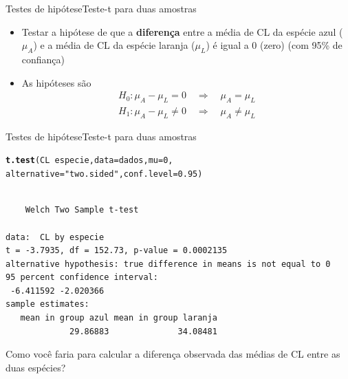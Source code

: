 \documentclass[10pt]{beamer}\usepackage[]{graphicx}\usepackage[]{color}
\makeatletter
\newcommand{\hlnum}[1]{\textcolor[rgb]{0.686,0.059,0.569}{#1}}%
\newcommand{\hlstr}[1]{\textcolor[rgb]{0.192,0.494,0.8}{#1}}%
\newcommand{\hlopt}[1]{\textcolor[rgb]{0,0,0}{#1}}%
\newcommand{\hlstd}[1]{\textcolor[rgb]{0.345,0.345,0.345}{#1}}%
\newcommand{\hlkwc}[1]{\textcolor[rgb]{0.333,0.667,0.333}{#1}}%
\newcommand{\hlkwd}[1]{\textcolor[rgb]{0.737,0.353,0.396}{\textbf{#1}}}%
\newenvironment{kframe}{%
 \def\at@end@of@kframe{}%
 \ifinner\ifhmode%
  \def\at@end@of@kframe{\end{minipage}}%
  \begin{minipage}{\columnwidth}%
 \fi\fi%
 \def\FrameCommand##1{\hskip\@totalleftmargin \hskip-\fboxsep
 \colorbox{shadecolor}{##1}\hskip-\fboxsep
     \hskip-\linewidth \hskip-\@totalleftmargin \hskip\columnwidth}%
 \MakeFramed {\advance\hsize-\width
   \@totalleftmargin\z@ \linewidth\hsize
   \@setminipage}}%
 {\par\unskip\endMakeFramed%
 \at@end@of@kframe}
\newenvironment{knitrout}{}{} %
\theoremstyle{definition}
\makeatother
\begin{document}
\begin{frame}[fragile]{Testes de hipótese}{Teste-t para duas amostras}
  \begin{itemize}
  \item Testar a hipótese de que a \textbf{diferença} entre a média de
    CL da espécie azul ($\mu_A$) e a média de CL da espécie laranja
    ($\mu_L$) é igual a 0 (zero) (com 95\% de confiança)
  \item As hipóteses são
    \begin{align*}
      H_0: \mu_A - \mu_L = 0 \quad \Rightarrow \quad \mu_A = \mu_L \\
      H_1: \mu_A - \mu_L \neq 0 \quad \Rightarrow \quad \mu_A \neq \mu_L
    \end{align*}
  \end{itemize}
\end{frame}

\begin{frame}[fragile]{Testes de hipótese}{Teste-t para duas amostras}
\begin{knitrout}\footnotesize
{}\color{fgcolor}\begin{kframe}
\begin{alltt}
\hlkwd{t.test}\hlstd{(CL} \hlopt{~} \hlstd{especie,} \hlkwc{data} \hlstd{= dados,} \hlkwc{mu} \hlstd{=} \hlnum{0}\hlstd{,}
       \hlkwc{alternative} \hlstd{=} \hlstr{"two.sided"}\hlstd{,} \hlkwc{conf.level} \hlstd{=} \hlnum{0.95}\hlstd{)}
\end{alltt}
\begin{verbatim}

	Welch Two Sample t-test

data:  CL by especie
t = -3.7935, df = 152.73, p-value = 0.0002135
alternative hypothesis: true difference in means is not equal to 0
95 percent confidence interval:
 -6.411592 -2.020366
sample estimates:
   mean in group azul mean in group laranja 
             29.86883              34.08481 
\end{verbatim}
\end{kframe}
\end{knitrout}
Como você faria para calcular a diferença observada das médias de CL
entre as duas espécies?
\end{frame}
\end{document}
